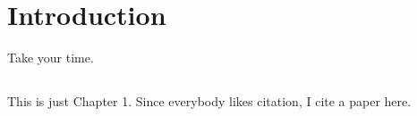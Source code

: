 \chapter{Introduction}

Take your time.

\section{}

This is just Chapter 1.
Since everybody likes citation, I cite a paper here\cite{andoni2006near}.